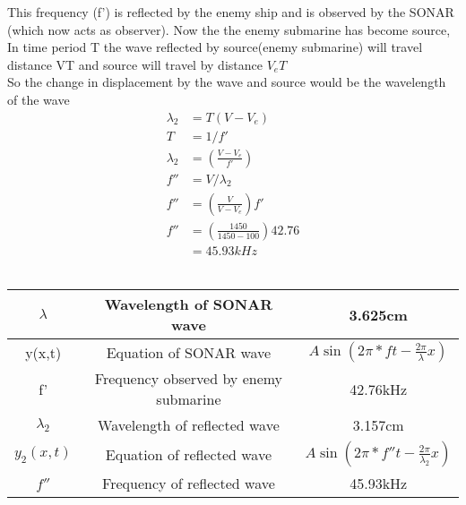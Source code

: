 \documentclass[journal,12pt,twocolumn]{IEEEtran}
\theoremstyle{remark}
\begin{document}
This frequency (f') is reflected by the enemy ship and is observed by the SONAR (which now acts as observer).
Now the the enemy submarine has become source,\\
In time period T the wave reflected by source(enemy submarine) will travel distance VT and source will travel by distance $V_eT$\\
So the change in displacement by the wave and source would be the wavelength of the wave
\begin{align}
\lambda_2&=T(V-V_e)\\
T&=1/f'\\
\lambda_2&=(\frac{V-V_e}{f'})\\
f''&=V/\lambda_2\\
f''&=(\frac{V}{V-V_e})f'\\
f''&=(\frac{1450}{1450-100})42.76\\
&=45.93kHz
\end{align}
\\
\footnotesize
\begin{tabular}{|c|c|c|}
   
   \hline
    $ \lambda$ & Wavelength of SONAR wave & 3.625cm\\
   \hline
   y(x,t) & Equation of SONAR wave & $A\sin(2\pi*ft-\frac{2\pi}{\lambda}x)$\\
   \hline
   f' & Frequency observed by enemy submarine & 42.76kHz\\
   \hline
   $\lambda_2$ & Wavelength of reflected wave & 3.157cm\\
   \hline 
   $ y_2(x,t)$ & Equation of reflected wave & $A\sin(2\pi*f''t-\frac{2\pi}{\lambda_2}x)$\\
   \hline
   $f''$& Frequency of reflected wave & 45.93kHz\\
   \hline
   
 
\end{tabular}
\end{document}
